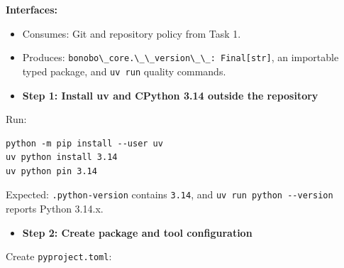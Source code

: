 \documentclass[
  letterpaper,
]{article}
\newcommand{\passthrough}[1]{#1}
\providecommand{\tightlist}{%
  \setlength{\itemsep}{0pt}\setlength{\parskip}{0pt}}
\begin{document}
\textbf{Interfaces:}

\begin{itemize}
\tightlist
\item
  Consumes: Git and repository policy from Task 1.
\item
  Produces: \passthrough{\lstinline!bonobo\_core.\_\_version\_\_: Final[str]!}, an importable typed package, and
  \passthrough{\lstinline!uv run!} quality commands.
\end{itemize}

\begin{itemize}
\tightlist
\item[$\boxtimes$]
  \textbf{Step 1: Install uv and CPython 3.14 outside the repository}
\end{itemize}

Run:

\begin{lstlisting}
python -m pip install --user uv
uv python install 3.14
uv python pin 3.14
\end{lstlisting}

Expected: \nolinkurl{.python-version} contains \passthrough{\lstinline!3.14!}, and
\passthrough{\lstinline!uv run python --version!} reports Python 3.14.x.

\begin{itemize}
\tightlist
\item[$\boxtimes$]
  \textbf{Step 2: Create package and tool configuration}
\end{itemize}

Create \nolinkurl{pyproject.toml}:
\end{document}
